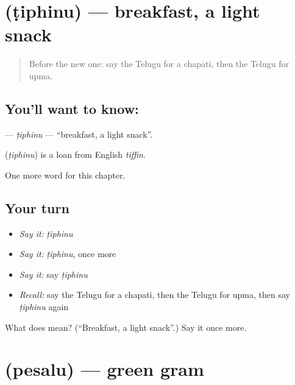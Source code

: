 \section[\texorpdfstring{\te{టిఫిను} (ṭiphinu)}{టిఫిను (ṭiphinu)}]{ (ṭiphinu) — breakfast, a light snack}

\label{lesson:TE-C262-tiphinu}



\begin{quote}
Before the new one: say the Telugu for a chapati, then the Telugu for upma.
\end{quote}

\subsection*{You'll want to know: }
\textbf{} — \emph{ṭiphinu} — \textquotedblleft{}breakfast, a light snack\textquotedblright{}.

\begin{cousinweb}
\textbf{} (\emph{ṭiphinu}) is a loan from English \emph{tiffin}.
\end{cousinweb}

\begin{grammarlens}[title={What you've built}]
One more word for this chapter.
\end{grammarlens}

\subsection*{Your turn}
\begin{itemize}
\raggedright
  \item \emph{Say it:} \emph{ṭiphinu}
  \item \emph{Say it:} \emph{ṭiphinu}, once more
  \item \emph{Say it:} say \emph{ṭiphinu}
  \item \emph{Recall:} say the Telugu for a chapati, then the Telugu for upma, then say \emph{ṭiphinu} again
\end{itemize}

\begin{tcolorbox}[breakable,colback=teal!4,colframe=teal!35!black,title={Before you move on}]
What does  mean? (\textquotedblleft{}Breakfast, a light snack\textquotedblright{}.) Say it once more.
\end{tcolorbox}
\section[\texorpdfstring{\te{పెసలు} (pesalu)}{పెసలు (pesalu)}]{ (pesalu) — green gram}

